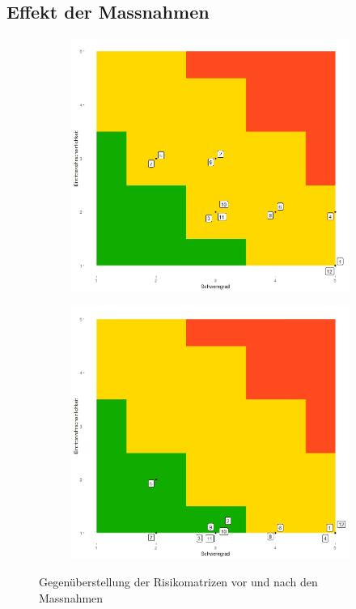 \documentclass[a4paper]{report}
\begin{document}
\pagebreak
\subsection{Effekt der Massnahmen}

\begin{figure}[h!]
	\centering
	\begin{subfigure}[b]{0.45\textwidth}
		\includegraphics[keepaspectratio,width=\textwidth]{Risikomatrix}
	\end{subfigure}
	\begin{subfigure}[b]{0.45\textwidth}
		\includegraphics[keepaspectratio,width=\textwidth]{Risikomatrix_nachher}
	\end{subfigure}
	\caption{Gegenüberstellung der Risikomatrizen vor und nach den Massnahmen}
	\label{fig:Gegenueberstellung}
\end{figure}
\end{document}
